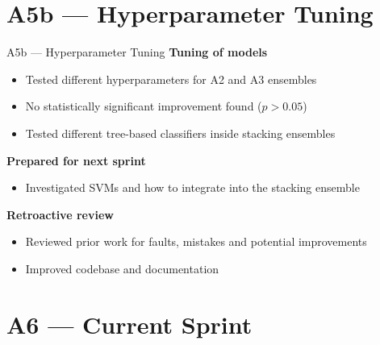 \documentclass{beamer}
\begin{document}
\section{A5b --- Hyperparameter Tuning}

\begin{frame}{A5b --- Hyperparameter Tuning}
    \textbf{Tuning of models}
    \begin{itemize}
        \item Tested different hyperparameters for A2 and A3 ensembles
        \item No statistically significant improvement found ($p > 0.05$)
        \item Tested different tree-based classifiers inside stacking ensembles
    \end{itemize}
    \vspace{0.5em}
    \textbf{Prepared for next sprint}
    \begin{itemize}
        \item Investigated SVMs and how to integrate into the stacking ensemble
    \end{itemize}
    \vspace{0.5em}
    \textbf{Retroactive review}
    \begin{itemize}
        \item Reviewed prior work for faults, mistakes and potential improvements
        \item Improved codebase and documentation
    \end{itemize}
\end{frame}

\section{A6 --- Current Sprint}
\end{document}
